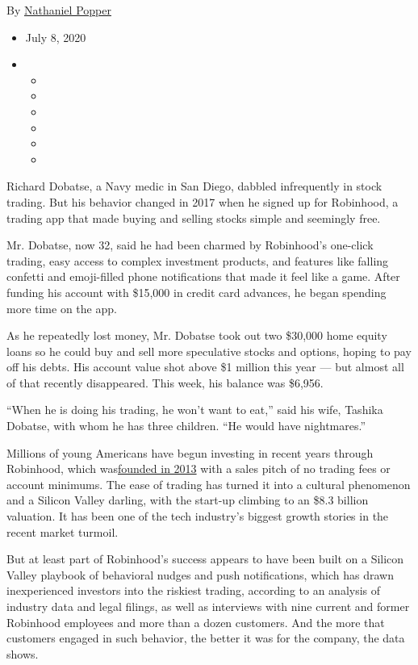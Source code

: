 By \href{https://www.nytimes.com/by/nathaniel-popper}{Nathaniel Popper}

\begin{itemize}
\item
  July 8, 2020
\item
  \begin{itemize}
  \item
  \item
  \item
  \item
  \item
  \item
  \end{itemize}
\end{itemize}

Richard Dobatse, a Navy medic in San Diego, dabbled infrequently in
stock trading. But his behavior changed in 2017 when he signed up for
Robinhood, a trading app that made buying and selling stocks simple and
seemingly free.

Mr. Dobatse, now 32, said he had been charmed by Robinhood's one-click
trading, easy access to complex investment products, and features like
falling confetti and emoji-filled phone notifications that made it feel
like a game. After funding his account with \$15,000 in credit card
advances, he began spending more time on the app.

As he repeatedly lost money, Mr. Dobatse took out two \$30,000 home
equity loans so he could buy and sell more speculative stocks and
options, hoping to pay off his debts. His account value shot above \$1
million this year --- but almost all of that recently disappeared. This
week, his balance was \$6,956.

``When he is doing his trading, he won't want to eat,'' said his wife,
Tashika Dobatse, with whom he has three children. ``He would have
nightmares.''

Millions of young Americans have begun investing in recent years through
Robinhood, which
was\href{https://www.nytimes.com/2017/02/18/business/robinhood-stock-trading-app.html}{founded
in 2013} with a sales pitch of no trading fees or account minimums. The
ease of trading has turned it into a cultural phenomenon and a Silicon
Valley darling, with the start-up climbing to an \$8.3 billion
valuation. It has been one of the tech industry's biggest growth stories
in the recent market turmoil.

But at least part of Robinhood's success appears to have been built on a
Silicon Valley playbook of behavioral nudges and push notifications,
which has drawn inexperienced investors into the riskiest trading,
according to an analysis of industry data and legal filings, as well as
interviews with nine current and former Robinhood employees and more
than a dozen customers. And the more that customers engaged in such
behavior, the better it was for the company, the data shows.

